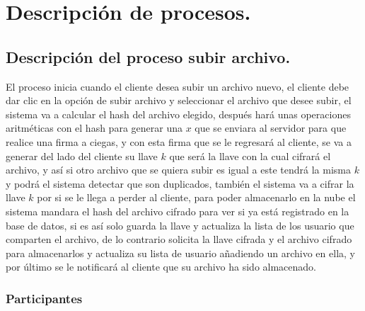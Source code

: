 


\section{Descripción de procesos. }

\subsection{Descripción del proceso subir archivo.}

El proceso inicia cuando el cliente desea subir un archivo nuevo, el cliente debe dar clic en la opción de subir archivo y seleccionar el archivo que desee subir, el sistema va a calcular el hash del archivo elegido, después hará unas operaciones aritméticas con el hash para generar una $x$ que se enviara al servidor para que realice una firma a ciegas, y con esta firma que se le regresará al cliente, se va a generar del lado del cliente su llave $k$ que será la llave con la cual cifrará el archivo, y así si otro archivo que se quiera subir es igual a este tendrá la misma $k$ y podrá el sistema detectar que son duplicados, también el sistema va a cifrar la llave $k$ por si se le llega a perder al cliente, para poder almacenarlo en la nube el sistema mandara el hash del archivo cifrado para ver si ya está registrado en la base de datos, si es así solo guarda la llave y actualiza la lista de los usuario que comparten el archivo, de lo contrario solicita la llave cifrada y el archivo cifrado para almacenarlos y actualiza su lista de usuario añadiendo un archivo en ella, y por último se le notificará al cliente que su archivo ha sido almacenado.



\subsubsection{Participantes}

